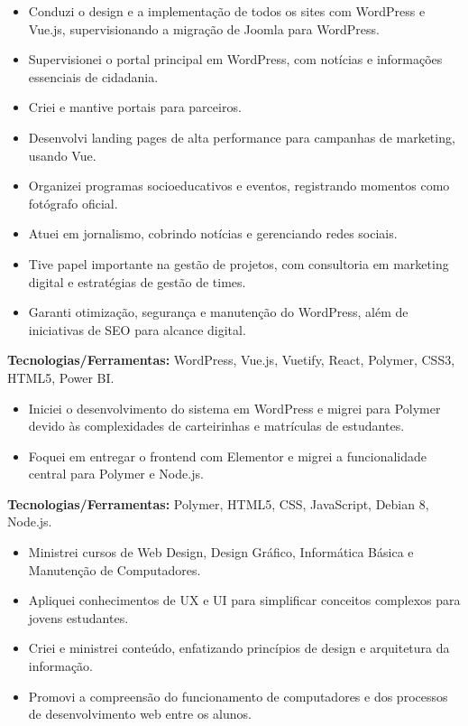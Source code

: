 \documentclass[10pt,a4paper]{altacv}
\begin{document}
\begin{itemize}
    \setlength{\itemindent}{0.5em}
    \item[--] Conduzi o design e a implementação de todos os sites com WordPress e Vue.js, supervisionando a migração de Joomla para WordPress.
    \item[--] Supervisionei o portal principal em WordPress, com notícias e informações essenciais de cidadania.
    \item[--] Criei e mantive portais para parceiros.
    \item[--] Desenvolvi landing pages de alta performance para campanhas de marketing, usando Vue.
    \item[--] Organizei programas socioeducativos e eventos, registrando momentos como fotógrafo oficial.
    \item[--] Atuei em jornalismo, cobrindo notícias e gerenciando redes sociais.
    \item[--] Tive papel importante na gestão de projetos, com consultoria em marketing digital e estratégias de gestão de times.
    \item[--] Garanti otimização, segurança e manutenção do WordPress, além de iniciativas de SEO para alcance digital.
\end{itemize}
\textbf{Tecnologias/Ferramentas:} WordPress, Vue.js, Vuetify, React, Polymer, CSS3, HTML5, Power BI.
\vspace{5mm}

\begin{itemize}
    \setlength{\itemindent}{0.5em}
    \item[--] Iniciei o desenvolvimento do sistema em WordPress e migrei para Polymer devido às complexidades de carteirinhas e matrículas de estudantes.
    \item[--] Foquei em entregar o frontend com Elementor e migrei a funcionalidade central para Polymer e Node.js.
\end{itemize}
\textbf{Tecnologias/Ferramentas:} Polymer, HTML5, CSS, JavaScript, Debian 8, Node.js.
\vspace{5mm}

\begin{itemize}
    \setlength{\itemindent}{0.5em}
    \item[--] Ministrei cursos de Web Design, Design Gráfico, Informática Básica e Manutenção de Computadores.
    \item[--] Apliquei conhecimentos de UX e UI para simplificar conceitos complexos para jovens estudantes.
    \item[--] Criei e ministrei conteúdo, enfatizando princípios de design e arquitetura da informação.
    \item[--] Promovi a compreensão do funcionamento de computadores e dos processos de desenvolvimento web entre os alunos.
\end{itemize}
\end{document}

